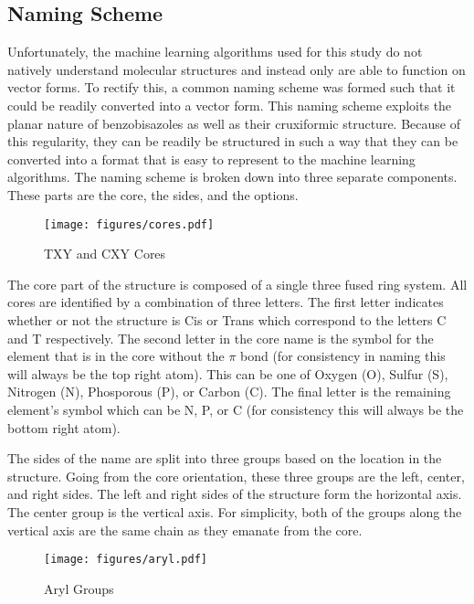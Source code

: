\documentclass[10pt]{article}
\begin{document}
\subsection{Naming Scheme}

Unfortunately, the machine learning algorithms used for this study do not natively understand molecular structures and instead only are able to function on vector forms. To rectify this, a common naming scheme was formed such that it could be readily converted into a vector form. This naming scheme exploits the planar nature of benzobisazoles as well as their cruxiformic structure. Because of this regularity, they can be readily be structured in such a way that they can be converted into a format that is easy to represent to the machine learning algorithms. The naming scheme is broken down into three separate components. These parts are the core, the sides, and the options.

\begin{figure}[H]
  \begin{center}
    \texttt{[image: figures/cores.pdf]}
  \end{center}
  \caption{TXY and CXY Cores}
  \label{fig:cores}
\end{figure}

The core part of the structure is composed of a single three fused ring system. All cores are identified by a combination of three letters. The first letter indicates whether or not the structure is Cis or Trans which correspond to the letters C and T respectively. The second letter in the core name is the symbol for the element that is in the core without the $\pi$ bond (for consistency in naming this will always be the top right atom). This can be one of Oxygen (O), Sulfur (S), Nitrogen (N), Phosporous (P), or Carbon (C). The final letter is the remaining element's symbol which can be N, P, or C (for consistency this will always be the bottom right atom).

The sides of the name are split into three groups based on the location in the structure. Going from the core orientation, these three groups are the left, center, and right sides. The left and right sides of the structure form the horizontal axis. The center group is the vertical axis. For simplicity, both of the groups along the vertical axis are the same chain as they emanate from the core.

\begin{figure}[H]
  \begin{center}
    \texttt{[image: figures/aryl.pdf]}
  \end{center}
  \caption{Aryl Groups}
  \label{fig:Aryl}
\end{figure}
\end{document}
